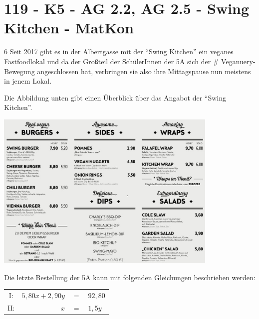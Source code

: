 \section{119 - K5 - AG 2.2, AG 2.5 - Swing Kitchen - MatKon}

\begin{langesbeispiel} \item[6] %
Seit 2017 gibt es in der Albertgasse mit der "`Swing Kitchen"' ein veganes Fastfoodlokal und da der Großteil der SchülerInnen der 5A sich der \#\! Veganuery-Bewegung angeschlossen hat, verbringen sie also ihre Mittagspause nun meistens in jenem Lokal.

Die Abbildung unten gibt einen Überblick über das Angabot der "`Swing Kitchen"'.
\begin{center}
\includegraphics[width=0.8\textwidth]{../_database/Bilder/119_swingkitchen.eps}
\end{center}

Die letzte Bestellung der 5A kann mit folgenden Gleichungen beschrieben werden:
\begin{center}
\begin{tabular}{crcl}
I:&$5,80x+2,90y$&$=$&$92,80$\\
II:&$x$&$=$&$1,5y$\\
\end{tabular}
\end{center}%

\begin{aufgabenstellung}
\item %



\end{aufgabenstellung}
\end{langesbeispiel}
